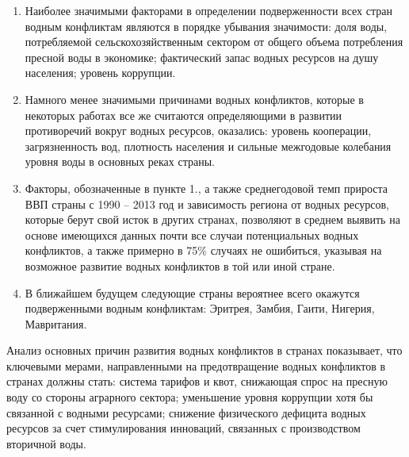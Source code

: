 \documentclass[a4paper, 12pt]{article}
\theoremstyle{plain} %
\theoremstyle{definition} %
\theoremstyle{remark} %
\begin{document}
\begin{enumerate}
	\item Наиболее значимыми факторами в определении подверженности всех стран водным конфликтам являются в порядке убывания значимости: доля воды, потребляемой сельскохозяйственным сектором от общего объема потребления пресной воды в экономике; фактический запас водных ресурсов на душу населения; уровень коррупции.
	\item Намного менее значимыми причинами водных конфликтов, которые в некоторых работах все же считаются определяющими в развитии противоречий вокруг водных ресурсов, оказались: уровень кооперации, загрязненность вод, плотность населения и сильные межгодовые колебания уровня воды в основных реках страны.
	\item Факторы, обозначенные в пункте 1., а также среднегодовой темп прироста ВВП страны с 1990 – 2013 год и зависимость региона от водных ресурсов, которые берут свой исток в других странах, позволяют в среднем выявить на основе имеющихся данных почти все случаи потенциальных водных конфликтов, а также примерно в 75\% случаях не ошибиться, указывая на возможное развитие водных конфликтов в той или иной стране.
	\item В ближайшем будущем следующие страны вероятнее всего окажутся подверженными водным конфликтам: Эритрея, Замбия, Гаити, Нигерия, Мавритания.
\end{enumerate}

Анализ основных причин развития водных конфликтов в странах показывает, что ключевыми мерами, направленными на предотвращение водных конфликтов в странах должны стать: система тарифов и квот, снижающая спрос на пресную воду со стороны аграрного сектора; уменьшение уровня коррупции хотя бы связанной с водными ресурсами; снижение физического дефицита водных ресурсов за счет стимулирования инноваций, связанных с производством вторичной воды.
\newpage
\nocite{*}
\printbibliography[title={Литература и электронные источники}, heading=bibintoc]
\end{document}
